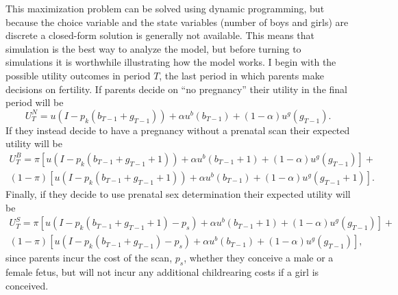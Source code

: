 \documentclass[12pt,letterpaper]{article}
\begin{document}
This maximization problem can be solved using dynamic programming, 
but because the choice variable and the state variables (number of
boys and girls) are discrete a closed-form solution
is generally not available.
This means that simulation is the best way to analyze the model,
but before turning to simulations it is worthwhile illustrating
how the model works.
I begin with the possible utility outcomes in period $T$, the last period 
in which parents make decisions on fertility.
If parents decide on ``no pregnancy'' their utility in the final period will be
\begin{equation}
U_T^N =
u(I - p_k(b_{T-1} + g_{T-1})) + \alpha u^b(b_{T-1}) + (1 - \alpha) u^g(g_{T-1}).
\end{equation}
If they instead decide to have a pregnancy without a prenatal scan 
their expected utility will be 
\begin{multline}
U_T^B = 
\pi [ 
u(I - p_k(b_{T-1} + g_{T-1} + 1)) + \alpha u^b(b_{T-1}+1) + (1-\alpha) u^g(g_{T-1}) 
]
+\\
(1-\pi) [ 
u(I - p_k(b_{T-1} + g_{T-1} + 1)) + \alpha u^b(b_{T-1}) + (1-\alpha) u^g(g_{T-1}+1) 
].
\end{multline}
Finally, if they decide to use prenatal sex determination their
expected utility will be
\begin{multline}
U_T^S = 
\pi [ 
u(I - p_k(b_{T-1} + g_{T-1} + 1) - p_s) + \alpha u^b(b_{T-1}+1) + (1-\alpha) u^g(g_{T-1}) 
]
+ \\
(1-\pi) [ 
u(I - p_k(b_{T-1} + g_{T-1}) - p_s) + \alpha u^b(b_{T-1}) + (1-\alpha) u^g(g_{T-1}) 
],
\end{multline}
since parents incur the cost of the scan, $p_s$, whether they conceive
a male or a female fetus, but will not incur any additional childrearing costs
if a girl is conceived.
\end{document}
